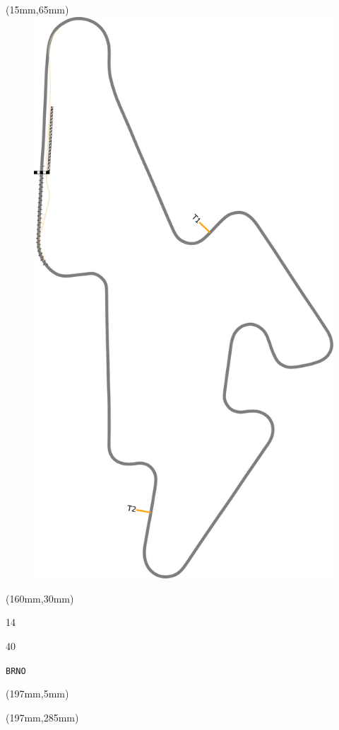 \begin{textblock*}{185mm}(15mm,65mm)%
\centering
\mbox{\includegraphics[width=185mm,height=210mm,keepaspectratio]{PT/BRNO.pdf}}
\end{textblock*}
\begin{textblock*}{40mm}(160mm,30mm)%
\Large
\par{} 
\par14 
\par40 
\par\hfill\tiny\tt BRNO\\
\end{textblock*}
\begin{textblock*}{20mm}(197mm,5mm)%
\fbox{\thepage}
\label{BRNO}
\end{textblock*}
\begin{textblock*}{20mm}(197mm,285mm)%
\fbox{\thepage}
\end{textblock*}

